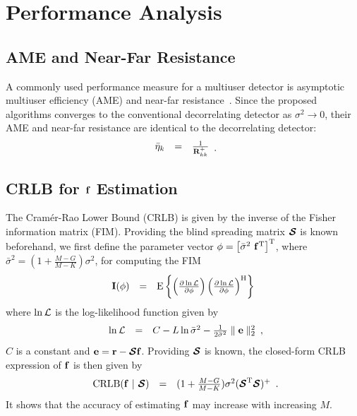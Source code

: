 \documentclass[a4paper,10pt,fleqn, twocolumn]{IEEETran}
\newcommand{\br}{{\mathbf r}}
\newcommand{\bbf}{{\bf f}}
\newcommand{\bI}{{\bf I}}
\newcommand{\bR}{{\bf R}}
\newcommand{\bcS}{{\mbox {\boldmath ${\cal S}$}}}
\begin{document}
\section{Performance Analysis}
\subsection{AME and Near-Far Resistance}
A commonly used performance measure for a multiuser detector is
asymptotic multiuser efficiency (AME) and near-far
resistance~\cite{Verd98}. Since the proposed algorithms converges
to the conventional decorrelating detector as $\sigma^2\rightarrow
0$, their AME and near-far resistance are identical to the
decorrelating detector:
\begin{equation}
\begin{array}{rcl}
\bar{\eta}_k&=&\frac{1}{\bR_{kk}^{+}}
\end{array}.
\end{equation}
\subsection{CRLB for $\bbf$ Estimation}
The Cram\'{e}r-Rao Lower Bound (CRLB) is given by the inverse of
the Fisher information matrix (FIM). Providing the blind spreading
matrix $\bcS$ is known beforehand, we first define the parameter
vector $\mathbf{\phi} = \left[\bar{\sigma}^{2}\ \bbf^{\rm
T}\right]^{\rm T}$, where $\bar{\sigma}^{2}
=(1+\frac{M-G}{M-K})\sigma^{2}$, for computing the FIM
\begin{equation}
\begin{array}{rcl}
{\bI(\mathbf{\phi})} &=& {\rm E} \left\{ \left( \frac{\partial
\ln{\cal L}}{\partial \mathbf{\phi}} \right) \left( \frac{\partial
\ln{\cal L}}{\partial \mathbf{\phi}} \right)^{\rm H} \right\}
\label{fim}
\end{array}
\end{equation}
\noindent where $\ln{\cal L}$ is the log-likelihood function given
by
\begin{equation}
\begin{array}{rcl}
\ln{\cal
L}&=&C-L\ln\bar{\sigma}^2-\frac{1}{2\bar{\sigma}^2}\parallel\mathbf{e}\parallel_2^2
\end{array},\label{logl}
\end{equation}
\noindent $C$ is a constant and $\mathbf{e}=\br-\bcS\bbf$.
Providing $\bcS$ is known, the closed-form CRLB expression of
$\bbf$ is then given by
\begin{equation}
\begin{array}{rcl}
{\rm CRLB}(\bbf\ |\ \bcS) &
=&(1+\frac{M-G}{M-K})\sigma^{2}(\bcS^{\rm T}\bcS)^{\rm +}
\end{array}.\label{CRLB_f}
\end{equation}
\noindent It shows that the accuracy of estimating $\bbf$ may
increase with increasing $M$.
\end{document}
